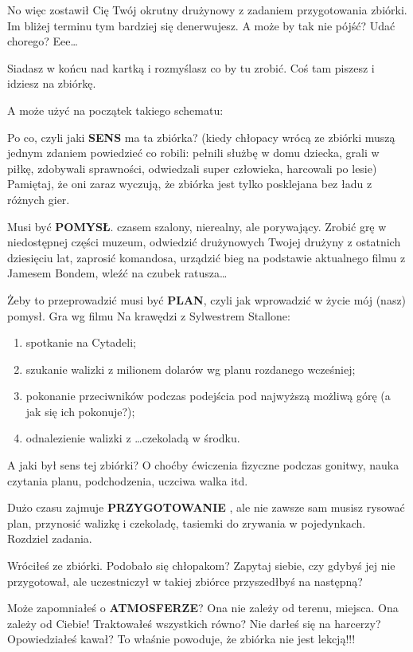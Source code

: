 No więc zostawił Cię Twój  okrutny drużynowy z zadaniem  przygotowania  zbiórki. 
Im bliżej terminu tym bardziej się denerwujesz. 
A może by tak nie pójść? 
Udać chorego? 
Eee\ldots
	
Siadasz w końcu nad kartką i rozmyślasz co by tu zrobić. Coś tam piszesz i  idziesz na zbiórkę. 
	
A może użyć  na  początek  takiego schematu:

Po co, czyli jaki \textbf{SENS} ma ta zbiórka? 
(kiedy chłopacy wrócą ze zbiórki muszą jednym zdaniem powiedzieć co robili: pełnili służbę w domu dziecka, grali w piłkę, zdobywali sprawności, odwiedzali super człowieka, harcowali po lesie) 
Pamiętaj, że oni zaraz wyczują, że zbiórka jest  tylko posklejana bez ładu z różnych gier.

Musi być \textbf{POMYSŁ}. czasem szalony, nierealny, ale porywający. Zrobić grę w niedostępnej części muzeum, odwiedzić drużynowych Twojej drużyny z ostatnich dziesięciu lat, zaprosić komandosa, urządzić bieg na podstawie aktualnego filmu z Jamesem Bondem, wleźć na czubek ratusza\ldots

Żeby to przeprowadzić musi być \textbf{PLAN}, czyli jak wprowadzić w życie mój (nasz) pomysł.
Gra  wg filmu Na  krawędzi z Sylwestrem Stallone:
\begin{enumerate} 
\item spotkanie na Cytadeli;
\item szukanie walizki z milionem dolarów wg planu rozdanego wcześniej;
\item pokonanie przeciwników podczas podejścia pod najwyższą możliwą górę (a jak  się  ich  pokonuje?);
\item odnalezienie walizki z \ldots czekoladą w środku.
\end{enumerate}
A jaki był  sens tej zbiórki? 
O choćby ćwiczenia fizyczne podczas gonitwy, nauka czytania planu, podchodzenia, uczciwa walka itd.
	
Dużo czasu  zajmuje \textbf{PRZYGOTOWANIE} , ale nie zawsze sam musisz  rysować plan, przynosić walizkę i czekoladę, tasiemki do zrywania w pojedynkach. 
Rozdziel zadania.

Wróciłeś ze zbiórki. Podobało  się chłopakom?
Zapytaj siebie, czy gdybyś jej nie  przygotował, ale uczestniczył w takiej zbiórce przyszedłbyś na następną?
	
Może zapomniałeś o \textbf{ATMOSFERZE}? 
Ona nie zależy od terenu, miejsca. 
Ona zależy  od Ciebie! 
Traktowałeś wszystkich równo? 
Nie darłeś się na harcerzy? 
Opowiedziałeś kawał? 
To właśnie powoduje, że zbiórka nie jest lekcją!!!

